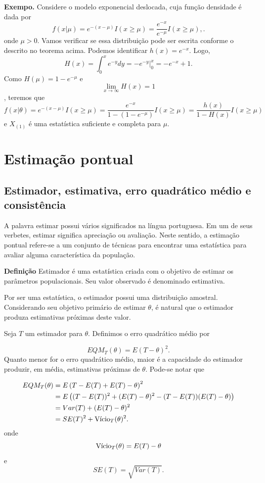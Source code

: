 \documentclass[
  letterpaper,
  DIV=11,
  numbers=noendperiod]{scrartcl}
\begin{document}
\textbf{Exempo.} Considere o modelo exponencial deslocada, cuja função
densidade é dada por
\[f(x|\mu)=e^{-(x-\mu)}I(x\geq \mu)=\frac{e^{-x}}{e^{-\mu}}I(x\geq \mu),.\]
onde \(\mu>0\). Vamos verificar se essa distribuição pode ser escrita
conforme o descrito no teorema acima. Podemos identificar
\(h(x)=e^{-x}\). Logo,
\[H(x)=\int_{0}^x  e^{-y}dy=\left. -e^{-y}\right|_0^x=-e^{-x}+1.\] Como
\(H(\mu)=1-e^{-\mu}\) e \[\lim_{x\rightarrow\infty }H(x)=1\], teremos
que
\[f(x|\theta)=e^{-(x-\mu)}I(x\geq\mu)=\frac{e^{-x}}{1-(1-e^{-\mu})}I(x\geq\mu)=\frac{h(x)}{1-H(x)}I(x\geq\mu)\]
e \(X_{(1)}\) é uma estatística suficiente e completa para \(\mu\).


\chapter{Estimação pontual}\label{estimauxe7uxe3o-pontual}

\section{Estimador, estimativa, erro quadrático médio e
consistência}\label{estimador-estimativa-erro-quadruxe1tico-muxe9dio-e-consistuxeancia}

A palavra estimar possui vários significados na língua portuguesa. Em um
de seus verbetes, estimar significa apreciação ou avaliação. Neste
sentido, a estimação pontual refere-se a um conjunto de técnicas para
encontrar uma estatística para avaliar alguma característica da
população.

\textbf{Definição} Estimador é uma estatística criada com o objetivo de
estimar os parâmetros populacionais. Seu valor observado é denominado
estimativa.

Por ser uma estatística, o estimador possui uma distribuição amostral.
Considerando seu objetivo primário de estimar \(\theta\), é natural que
o estimador produza estimativas próximas deste valor.

Seja \(T\) um estimador para \(\theta\). Definimos o erro quadrático
médio por

\[EQM_T(\theta)=E(T-\theta)^2.\] Quanto menor for o erro quadrático
médio, maior é a capacidade do estimador produzir, em média, estimativas
próximas de \(\theta\). Pode-se notar que

\[\begin{align}EQM_T(\theta)&=E\left(T-E(T)+E(T)-\theta\right)^2\\&=E\left( (T-E(T))^2+(E(T)-\theta)^2- (T-E(T))(E(T)-\theta)\right)\\&=Var(T)+(E(T)-\theta)^2\\&=SE(T)^2+\hbox{Vício}_T(\theta)^2.\end{align}\]
onde \[\hbox{Vício}_T(\theta)=E(T)-\theta\] e \[SE(T)=\sqrt{Var(T)}.\]
\end{document}
